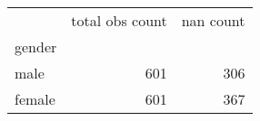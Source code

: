 \begin{tabular}{lrr}
\toprule
{} &  total obs count &  nan count \\
gender &                  &            \\
\midrule
male   &              601 &        306 \\
female &              601 &        367 \\
\bottomrule
\end{tabular}
